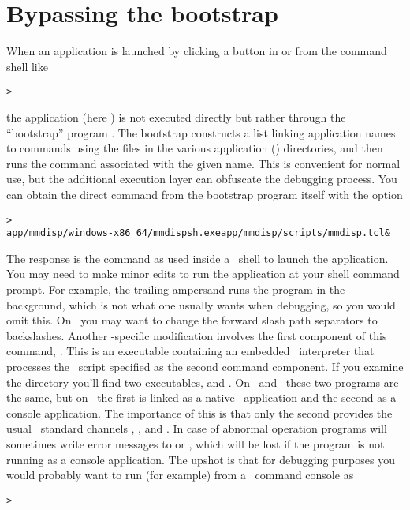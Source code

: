 \section{Bypassing the  bootstrap}\label{sec:debug:bootstrap}
When an application is launched by clicking a button in  or from
the command shell like
\begin{alltt}
> 
\end{alltt}\html{\newline}
the application (here ) is not executed directly but rather
through the ``bootstrap'' program . The bootstrap
constructs a list linking application names to commands
using the  files in the various application ()
directories, and then runs the command associated with the given
name. This is convenient for normal use, but the additional execution
layer can obfuscate the debugging process. You can obtain the
direct command from the bootstrap program itself with the 
option
\begin{alltt}
> 
app/mmdisp/windows-x86_64/mmdispsh.exe app/mmdisp/scripts/mmdisp.tcl &
\end{alltt}\html{\newline}
The response is the command as used inside a \Tcl\ shell to launch the
application. You may need to make minor edits to run the application at
your shell command prompt. For example, the trailing ampersand runs the
program in the background, which is not what one usually wants when
debugging, so you would omit this. On \Windows\ you may want to change
the forward slash path separators to backslashes. Another
\Windows-specific modification involves the first component of this
command, . This is an
executable containing an embedded \Tcl\ interpreter that processes the
\Tcl\ script specified as the second command component. If you examine
the  directory you'll find two
executables,  and . On \Unix\ and
\MacOSX\ these two programs are the same, but on \Windows\ the first is
linked as a native \Windows\ application and the second as a console
application. The importance of this is that only the second provides the
usual \Cplusplus\ standard channels , , and
. In case of abnormal operation programs will sometimes write
error messages to  or , which will be lost if the
program is not running as a console application. The upshot is that for
debugging purposes you would probably want to run  (for
example) from a \Windows\ command console as
\begin{alltt}
> 
\end{alltt}

